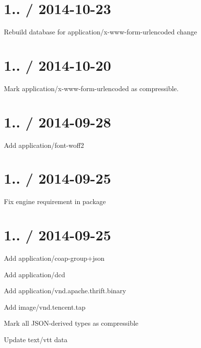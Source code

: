 \section*{1.. / 2014-\/10-\/23 }


\begin{DoxyItemize}
\item Rebuild database for {\ttfamily application/x-\/www-\/form-\/urlencoded} change
\end{DoxyItemize}

\section*{1.. / 2014-\/10-\/20 }


\begin{DoxyItemize}
\item Mark {\ttfamily application/x-\/www-\/form-\/urlencoded} as compressible.
\end{DoxyItemize}

\section*{1.. / 2014-\/09-\/28 }


\begin{DoxyItemize}
\item Add {\ttfamily application/font-\/woff2}
\end{DoxyItemize}

\section*{1.. / 2014-\/09-\/25 }


\begin{DoxyItemize}
\item Fix engine requirement in package
\end{DoxyItemize}

\section*{1.. / 2014-\/09-\/25 }


\begin{DoxyItemize}
\item Add {\ttfamily application/coap-\/group+json}
\item Add {\ttfamily application/dcd}
\item Add {\ttfamily application/vnd.\+apache.\+thrift.\+binary}
\item Add {\ttfamily image/vnd.\+tencent.\+tap}
\item Mark all J\+S\+O\+N-\/derived types as compressible
\item Update {\ttfamily text/vtt} data
\end{DoxyItemize}

